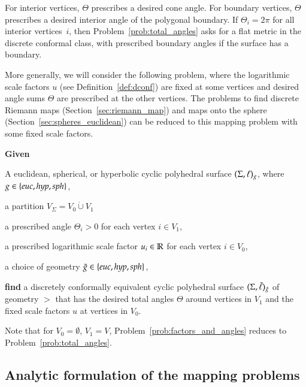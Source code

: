 \documentclass[Thesis]{subfiles}
\begin{document}
For interior vertices, $\Theta$ prescribes a desired cone angle.  For
boundary vertices, $\Theta$ prescribes a desired interior angle of the
polygonal boundary.  If $\Theta_{i}=2\pi$ for all interior
vertices~$i$, then Problem~\ref{prob:total_angles} asks for a flat
metric in the discrete conformal class, with prescribed boundary
angles if the surface has a boundary.

More generally, we will consider the following problem, where the
logarithmic scale factors $u$ (see Definition~\ref{def:dconf}) are
fixed at some vertices and desired angle sums $\Theta$ are prescribed
at the other vertices. The problems to find discrete Riemann maps
(Section~\ref{sec:riemann_map}) and maps onto the sphere
(Section~\ref{sec:spheres_euclidean}) can be reduced to this mapping problem
with some fixed scale factors.

\begin{problem}
\label{prob:factors_and_angles}
\textbf{Given}
\begin{compactitem}
\item A euclidean, spherical, or hyperbolic cyclic polyhedral surface
   $(\Sigma,\ell)_{g}$, where $\g\in\{\euc, \hyp, \sph\}$,
\item a partition $V_{\Sigma}=V_0\dot\cup V_1$
\item a prescribed angle $\Theta_{i} > 0$ for each vertex $i\in V_1$,
\item a prescribed logarithmic scale factor $u_i\in \mathbb R$ for each vertex $i\in V_0$,
\item a choice of geometry $\gt\in\{\euc, \hyp, \sph\}$,
\end{compactitem}
\noindent%
\textbf{find} a discretely conformally equivalent cyclic polyhedral surface
$(\Sigma,\tilde{\ell})_{\tilde{g}}$ of geometry $\gt$ that has the desired total angles $\Theta$
around vertices in $V_1$ and the fixed scale factors $u$ at vertices
in $V_{0}$.
\end{problem}

Note that for $V_{0}=\emptyset$, $V_{1}=V$,
Problem~\ref{prob:factors_and_angles} reduces to
Problem~\ref{prob:total_angles}.

\subsection{Analytic formulation of the mapping problems}
\label{sec:analytic}
\end{document}

